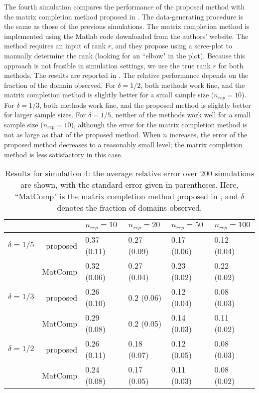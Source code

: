 \documentclass[11pt]{article}
\newcommand{\0}{{\mathbf{0}}}
\newcommand{\1}{{\mathbf{1}}}
\begin{document}
The fourth simulation compares the performance of the proposed method with the matrix completion method proposed in \cite{descary2017recovering}. The data-generating procedure is the same as those of the previous simulations. The matrix completion method is implemented using the Matlab code downloaded from the authors' website. The method requires an input of rank $r$, and they propose using a scree-plot to manually determine the rank (looking for an ``elbow" in the plot). Because this approach is not feasible in simulation settings, we use the true rank $r$ for both methods. 
The results are reported in . The relative performance depends on the fraction of the domain observed. For $\delta = 1/2$, both methods work fine, and the matrix completion method is slightly better for a small sample size ($n_{rep}= 10$). For $\delta = 1/3$, both methods work fine, and the proposed method is slightly better for larger sample sizes. For $\delta = 1/5$, neither of the methods work well for a small sample size ($n_{rep} = 10$), although the error for the matrix completion method is not as large as that of the proposed method. When $n$ increases, the error of the proposed method decreases to a reasonably small level; the matrix completion method is less satisfactory in this case. 


\begin{table}[ht]
	\centering
	\caption{Results for simulation 4: the average relative error over 200 simulations are shown, with the standard error given in parentheses. Here, ``MatComp" is the matrix completion method proposed in \cite{descary2017recovering}, and $\delta$ denotes the fraction of domains observed.}
	\vskip 5pt
	\label{tab:simu4}
	\begin{tabular}{r|rllll}
		\hline
		\hline
		& & $n_{rep}=10$ & $n_{rep}=20$ & $n_{rep} = 50$ & $n_{rep} = 100$ \\ 
		\hline
		$\delta = 1/5$ & proposed & 0.37 (0.11)  & 0.27 (0.09)  & 0.17 (0.06)  & 0.12 (0.04)   \\ 
		& MatComp & 0.32 (0.06)  & 0.27 (0.04)  & 0.23 (0.02)  & 0.22 (0.02)  \\ 
		\hline
		$\delta = 1/3$& proposed& 0.26 (0.10)  & 0.2 (0.06)  & 0.12 (0.04)  & 0.08 (0.03)  \\ 
		& MatComp & 0.29 (0.08)  & 0.2 (0.05)  & 0.14 (0.03)  & 0.11 (0.02) \\ 
		\hline
		$\delta = 1/2$& proposed & 0.26 (0.11)  & 0.18 (0.07)  & 0.12 (0.05)  & 0.08 (0.03)  \\ 
		& MatComp & 0.24 (0.08)  & 0.17 (0.05)  & 0.11 (0.03)  & 0.08 (0.02) \\ 
		\hline
		\hline
	\end{tabular}
\end{table}
\end{document}
